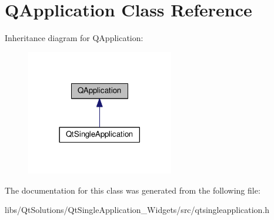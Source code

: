 \hypertarget{class_q_application}{}\section{Q\+Application Class Reference}
\label{class_q_application}


Inheritance diagram for Q\+Application\+:
\nopagebreak
\begin{figure}[H]
\begin{center}
\leavevmode
\includegraphics[width=182pt]{class_q_application__inherit__graph}
\end{center}
\end{figure}


The documentation for this class was generated from the following file\+:\begin{DoxyCompactItemize}
\item 
libs/\+Qt\+Solutions/\+Qt\+Single\+Application\+\_\+\+Widgets/src/qtsingleapplication.\+h\end{DoxyCompactItemize}
